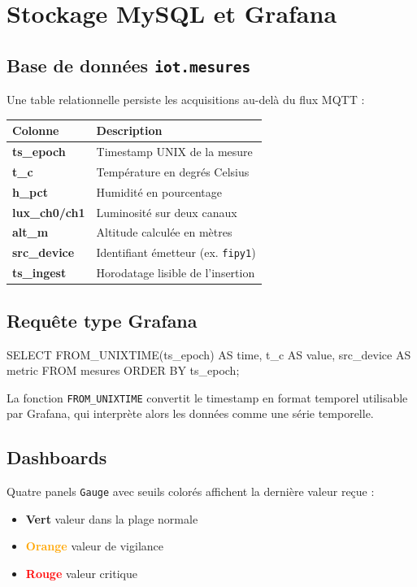 \documentclass[11pt,a4paper]{article}
\begin{document}
\section{Stockage MySQL et Grafana}

\subsection{Base de données \texttt{iot.mesures}}

Une table relationnelle persiste les acquisitions au-delà du flux MQTT :

\begin{tabularx}{\linewidth}{@{}>{\ttfamily\bfseries}l X@{}}
\toprule
\rowcolor{light} \normalfont\textbf{Colonne} & Description \\ \midrule
ts\_epoch       & Timestamp UNIX de la mesure \\
t\_c            & Température en degrés Celsius \\
h\_pct          & Humidité en pourcentage \\
lux\_ch0/ch1    & Luminosité sur deux canaux \\
alt\_m          & Altitude calculée en mètres \\
src\_device     & Identifiant émetteur (ex. \texttt{fipy1}) \\
ts\_ingest      & Horodatage lisible de l'insertion \\
\bottomrule
\end{tabularx}

\subsection{Requête type Grafana}

\begin{codebox}[listing options={style=pystyle,language=SQL}]
SELECT
  FROM_UNIXTIME(ts_epoch) AS time,
  t_c                     AS value,
  src_device              AS metric
FROM mesures
ORDER BY ts_epoch;
\end{codebox}

La fonction \texttt{FROM\_UNIXTIME} convertit le timestamp en format temporel utilisable par Grafana, qui interprète alors les données comme une série temporelle.

\subsection{Dashboards}

Quatre panels \texttt{Gauge} avec seuils colorés affichent la dernière valeur reçue :
\begin{itemize}
  \item \textcolor{green!60!black}{\textbf{Vert}} \textemdash{} valeur dans la plage normale
  \item \textcolor{orange}{\textbf{Orange}} \textemdash{} valeur de vigilance
  \item \textcolor{red}{\textbf{Rouge}} \textemdash{} valeur critique
\end{itemize}
\end{document}
